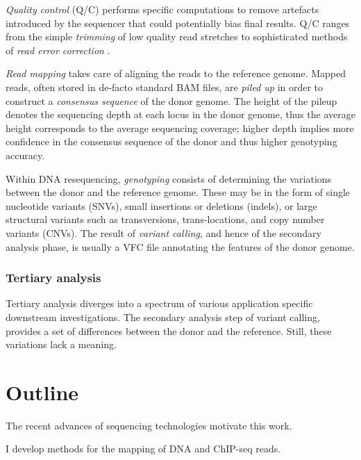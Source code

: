 \emph{Quality control} (Q/C) performs specific computations to remove artefacts introduced by the sequencer that could potentially bias final results.
Q/C ranges from the simple \emph{trimming} of low quality read stretches to sophisticated methods of \emph{read error correction} \citep{fiona}.

\emph{Read mapping} takes care of aligning the reads to the reference genome.
Mapped reads, often stored in de-facto standard BAM files, are \emph{piled up} in order to construct a \emph{consensus sequence} of the donor genome.
The height of the pileup denotes the sequencing depth at each locus in the donor genome, thus the average height corresponds to the average sequencing coverage;
higher depth implies more confidence in the consensus sequence of the donor and thus higher genotyping accuracy.

Within DNA resequencing, \emph{genotyping} consists of determining the variations between the donor and the reference genome.
These may be in the form of single nucleotide variants (SNVs), small insertions or deletions (indels), or large structural variants such as transversions, trans-locations, and copy number variants (CNVs).
The result of \emph{variant calling}, and hence of the secondary analysis phase, is usually a VFC file annotating the features of the donor genome.

\subsubsection{Tertiary analysis}

Tertiary analysis diverges into a spectrum of various application specific downstream investigations.
The secondary analysis step of variant calling, provides a set of differences between the donor and the reference.
Still, these variations lack a meaning.




\section{Outline}

The recent advances of sequencing technologies motivate this work.

I develop methods for the mapping of DNA and ChIP-seq reads.

